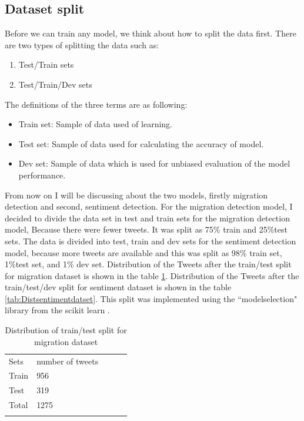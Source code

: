 \subsection{Dataset split}
Before we can train any model, we think about how to split the data first. There are two types of splitting the data such as:
\begin{enumerate}
    \item Test/Train sets
  \item Test/Train/Dev sets
\end{enumerate}
The definitions of the three terms are as following:
\begin{itemize}
     \item Train set: Sample of data used of learning.
 
    \item Test set: Sample of data used for calculating the accuracy of model.
      \item Dev set: Sample of data which is used for unbiased evaluation of the model performance.
\end{itemize}

From now on I will be discussing about the two models, firstly migration detection and second, sentiment detection. For the migration detection model, I decided to divide the data set in test and train sets for the migration detection model, Because there were fewer tweets. It was split as 75\% train and 25\%test sets. The data is divided into test, train and dev sets for the sentiment detection model, because more tweets are available and this was split as 98\% train set, 1\%test set, and 1\% dev set.
Distribution of the Tweets after the train/test split for migration dataset is shown in the table \ref{tab:Distmigrationdataset}. Distribution of the Tweets after the train/test/dev split for sentiment dataset is shown in the table \ref{tab:Distsentimentdatset}. This split was implemented using the ``modelselection" library from the scikit learn \cite{scikit-learn}.


\begin{table}[]
\centering
\begin{tabular}{lllll}
\cline{1-2}
\multicolumn{1}{|l|}{Sets}   & \multicolumn{1}{l|}{number of tweets} &  &  &  \\ \cline{1-2}
\multicolumn{1}{|l|}{Train} & \multicolumn{1}{l|}{956}  &  &  &  \\ \cline{1-2}
\multicolumn{1}{|l|}{Test} & \multicolumn{1}{l|}{319}  &  &  &  \\ \cline{1-2}
\multicolumn{1}{|l|}{Total}   & \multicolumn{1}{l|}{1275}  &  &  &  \\ \cline{1-2}
                            &                           &  &  & 
\label{tab:Distribution of sentiment class}
\end{tabular}
\caption{Distribution of train/test split for migration dataset}
\label{tab:Distmigrationdataset}
\end{table}

